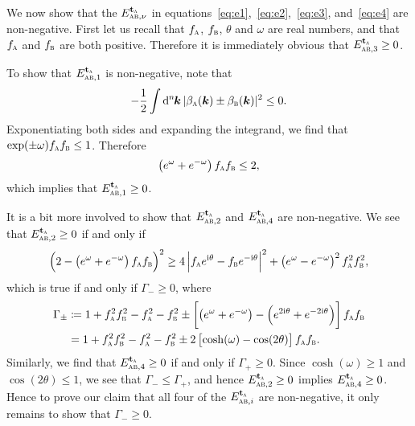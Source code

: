 \documentclass[pra,nofootinbib,floats,aps,twocolumn,tightenlines,superscriptaddress]{revtex4-1}
\renewcommand*\d[2][]{%
	\mathrm{d}%
	\ifx\relax#1\relax\else
	\rule{-0.02em}{1.5ex}^{#1}\rule{0.08em}{0ex}\!
	\fi
	#2\,
}
\newcommand{\ii}{\mathrm{i}}
\newcommand{\fa}{f_\textsc{a}}
\newcommand{\fb}{f_\textsc{b}}
\newcommand{\ba}{\beta_\textsc{a}(\bm k)}
\newcommand{\bb}{\beta_\textsc{b}(\bm k)}
\begin{document}
We now show that the $E_{\textsc{ab},\nu}^{{\text{\textbf{t}}}_\textsc{a}}$ in equations~\eqref{eq:e1},~\eqref{eq:e2},~\eqref{eq:e3}, and~\eqref{eq:e4} are non-negative. First let us recall that $\fa$, $\fb$, $\theta$ and $\omega$ are real numbers, and that $\fa$ and $\fb$ are both positive. Therefore it is immediately obvious that $E_{\textsc{ab},3}^{{\text{\textbf{t}}}_\textsc{a}}\ge0$.

To show that $E_{\textsc{ab},1}^{{\text{\textbf{t}}}_\textsc{a}}$ is non-negative, note that
\begin{equation}
    -\frac{1}{2}\int\d[n]{\bm k}
    |\ba\pm \bb|^2
    \le 0.
\end{equation}
Exponentiating both sides and expanding the integrand, we find that \mbox{$\exp(\pm\omega)\fa\fb\le 1$}. Therefore
\begin{equation}
    \left(e^\omega+e^{-\omega}\right)
    \fa\fb
    \le 2,
\end{equation}
which implies that $E_{\textsc{ab},1}^{{\text{\textbf{t}}}_\textsc{a}}\ge 0$.

It is a bit more involved to show that $E_{\textsc{ab},2}^{{\text{\textbf{t}}}_\textsc{a}}$ and $E_{\textsc{ab},4}^{{\text{\textbf{t}}}_\textsc{a}}$ are non-negative. We see that $E_{\textsc{ab},2}^{{\text{\textbf{t}}}_\textsc{a}}\ge 0$ if and only if
\begin{equation}
    \left(2-\left(e^\omega +e^{-\omega}\right)\fa\fb\right)^2
    \ge
    4\left|\fa e^{\ii\theta}-\fb e^{-\ii\theta}\right|^2 +
    \left(e^\omega -e^{-\omega}\right)^2 \fa^2\fb^2
    ,
\end{equation}
which is true if and only if $\Gamma_-\ge 0$, where 
\begin{align}
\label{eq:Gamma}
    \Gamma_\pm
    &\coloneqq
    1+\fa^2\fb^2-\fa^2-\fb^2
    \pm\left[\left(e^\omega +e^{-\omega}\right)-
    \left(e^{2\ii\theta}+e^{-2\ii\theta}
    \right)\right]\fa\fb
    \notag\\    
    &=1+\fa^2\fb^2-\fa^2-\fb^2
    \pm 2\left[\cosh(\omega)-\cos(2\theta)\right]\fa\fb.
    \notag
\end{align}
Similarly, we find that $E_{\textsc{ab},4}^{{\text{\textbf{t}}}_\textsc{a}}\ge 0$ if and only if $\Gamma_+\ge0$. Since $\cosh(\omega)\ge 1$ and $\cos(2\theta)\le 1$, we see that $\Gamma_-\le\Gamma_+$, and hence $E_{\textsc{ab},2}^{{\text{\textbf{t}}}_\textsc{a}}\ge 0$ implies $E_{\textsc{ab},4}^{{\text{\textbf{t}}}_\textsc{a}}\ge 0$. Hence to prove our claim that all four of the $E_{\textsc{ab},i}^{{\text{\textbf{t}}}_\textsc{a}}$ are non-negative, it only remains to show that $\Gamma_-\ge 0$.
\end{document}
